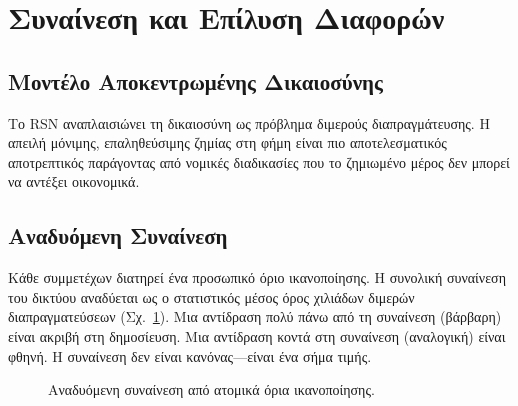 \documentclass[11pt,a4paper,twocolumn]{article}
\begin{document}
\section{Συναίνεση και Επίλυση Διαφορών}

\subsection{Μοντέλο Αποκεντρωμένης Δικαιοσύνης}

Το RSN αναπλαισιώνει τη δικαιοσύνη ως πρόβλημα διμερούς διαπραγμάτευσης. Η απειλή μόνιμης, επαληθεύσιμης ζημίας στη φήμη είναι πιο αποτελεσματικός αποτρεπτικός παράγοντας από νομικές διαδικασίες που το ζημιωμένο μέρος δεν μπορεί να αντέξει οικονομικά.

\subsection{Αναδυόμενη Συναίνεση}

Κάθε συμμετέχων διατηρεί ένα προσωπικό όριο ικανοποίησης. Η συνολική συναίνεση του δικτύου αναδύεται ως ο στατιστικός μέσος όρος χιλιάδων διμερών διαπραγματεύσεων (Σχ.~\ref{fig:consensus}). Μια αντίδραση πολύ πάνω από τη συναίνεση (βάρβαρη) είναι ακριβή στη δημοσίευση. Μια αντίδραση κοντά στη συναίνεση (αναλογική) είναι φθηνή. Η συναίνεση δεν είναι κανόνας---είναι ένα σήμα τιμής.

\begin{figure}[ht]
\centering
{}
\caption{Αναδυόμενη συναίνεση από ατομικά όρια ικανοποίησης.}
\label{fig:consensus}
\end{figure}
\end{document}
